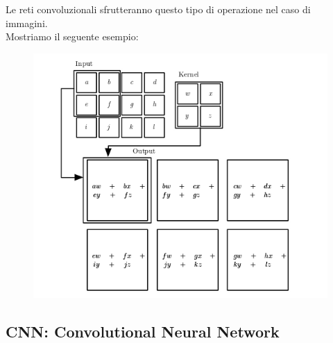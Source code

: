 \documentclass[12pt]{article}
\begin{document}
Le reti convoluzionali sfrutteranno questo tipo di 
operazione nel caso di immagini.\\ Mostriamo il seguente esempio:

\begin{figure}[H]{}
    \centering
    \includegraphics[scale=2.5]{../images/2conv.png}
    \label{fig:cc}
\end{figure}



\subsection{CNN: Convolutional Neural Network}
\end{document}
